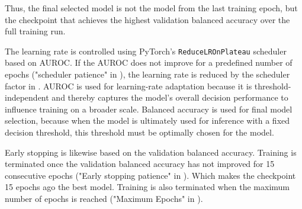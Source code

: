 Thus, the final selected model is not the model from the last training epoch, but the checkpoint that achieves the highest validation balanced accuracy over the full training run.

The learning rate is controlled using PyTorch's \texttt{ReduceLROnPlateau} scheduler based on AUROC. If the AUROC does not improve for a predefined number of epochs ("scheduler patience" in ), the learning rate is reduced by the scheduler factor in . AUROC is used for learning-rate adaptation because it is threshold-independent and thereby captures the model's overall decision performance to influence training on a broader scale. Balanced accuracy is used for final model selection, because when the model is ultimately used for inference with a fixed decision threshold, this threshold must be optimally chosen for the model.

Early stopping is likewise based on the validation balanced accuracy. Training is terminated once the validation balanced accuracy has not improved for 15 consecutive epochs ("Early stopping patience" in ). Which makes the checkpoint 15 epochs ago the best model. Training is also terminated when the maximum number of epochs is reached ("Maximum Epochs" in ).


